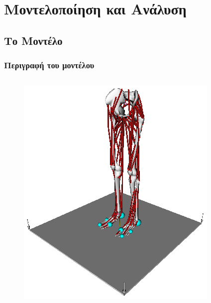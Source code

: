 \documentclass[8pt,sans,mathserif]{beamer}%
\begin{document}
\begin{frame}
\begin{columns}
    \end{columns}

\end{frame}

\section{Μοντελοποίηση και Ανάλυση}
\frame{\tableofcontents[currentsection]}

\subsection{Το Μοντέλο}
\begin{frame}
\frametitle{Περιγραφή του μοντέλου}

    \begin{columns}
        \begin{figure}[t]
            \includegraphics[width=1.0\linewidth, keepaspectratio]{fig/lower-limb-model.png}
        \end{figure}


\end{columns}
\end{frame}
\end{document}

